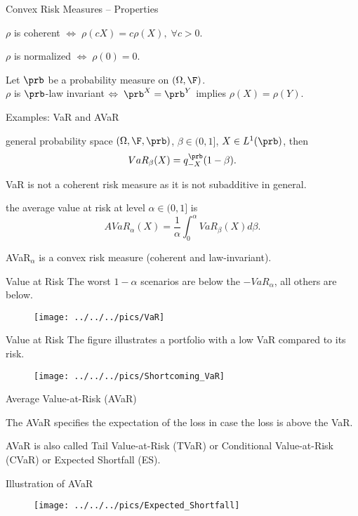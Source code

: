{Convex Risk Measures -- Properties}

\item $\rho$ is coherent $\Leftrightarrow \; \rho(cX) = c \rho(X), \; \forall c>0$.
\item $\rho$ is normalized $\Leftrightarrow \; \rho(0) = 0$.
\item Let $\prb$ be a probability measure on $(\Omega, \F)$.\\
$\rho$ is $\prb$-law invariant $\Leftrightarrow \; \prb^X = \prb^Y $ implies $\rho(X) = \rho(Y)$.

{Examples: VaR and AVaR}
\item general probability space $(\Omega, \F, \prb)$, $\beta \in (0,1]$, $X\in L^1(\prb)$, then
$$
VaR_\beta(X) = q_{-X}^{\prb}(1-\beta).
$$
 \item VaR is not a coherent risk measure as it is not subadditive in general.
\item the average value at risk at level $\alpha \in (0,1]$ is
$$
AVaR_\alpha(X) = \frac{1}{\alpha} \int_0^\alpha VaR_\beta(X) d\beta.
$$
\item AVaR$_\alpha$ is a convex risk measure (coherent and law-invariant).

{Value at Risk}
The worst $1-\alpha$ scenarios are below the $-VaR_\alpha$, all others are below.
\begin{figure}
	\centering
		\texttt{[image: ../../../pics/VaR]}
	\label{fig:VaR}
\end{figure}

{Value at Risk}
The figure illustrates a portfolio with a low VaR compared to its risk.
\begin{figure}
	\centering
		\texttt{[image: ../../../pics/Shortcoming\_VaR]}
	\label{fig:Shortcoming_VaR}
\end{figure}

{Average Value-at-Risk (AVaR) }
\item<1-> The AVaR specifies the expectation of the loss in case the loss is above the VaR.
\item<2-> AVaR is also called Tail Value-at-Risk (TVaR) or Conditional
Value-at-Risk (CVaR) or  Expected Shortfall (ES).

{Illustration of AVaR}
\begin{figure}
	\centering
		\texttt{[image: ../../../pics/Expected\_Shortfall]}
	\label{fig:Expected_Shortfall}
\end{figure}


